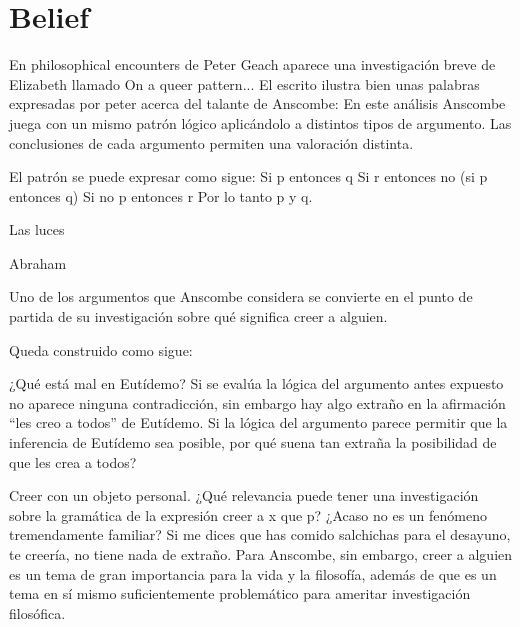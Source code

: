 \section{Belief}

En philosophical encounters de Peter Geach aparece una investigación breve de
Elizabeth llamado On a queer pattern... El escrito ilustra bien unas palabras
expresadas por peter acerca del talante de Anscombe:
En este análisis Anscombe juega con un mismo patrón lógico aplicándolo a
distintos tipos de argumento. Las conclusiones de cada argumento permiten una
valoración distinta.

El patrón se puede expresar como sigue:
Si p entonces q
Si r entonces no (si p entonces q)
Si no p entonces r
Por lo tanto p y q.

Las luces

Abraham

Uno de los argumentos que Anscombe considera se convierte en el punto de partida
de su investigación sobre qué significa creer a alguien.

Queda construido como sigue:

¿Qué está mal en Eutídemo? Si se evalúa la lógica del argumento antes expuesto
no aparece ninguna contradicción, sin embargo hay algo extraño en la afirmación
``les creo a todos'' de Eutídemo. Si la lógica del argumento parece permitir que
la inferencia de Eutídemo sea posible, por qué suena tan extraña la posibilidad
de que les crea a todos?

Creer con un objeto personal.
¿Qué relevancia puede tener una investigación sobre la gramática de la expresión
creer a x que p? ¿Acaso no es un fenómeno tremendamente familiar? Si me dices
que has comido salchichas para el desayuno, te creería, no tiene nada de
extraño. Para Anscombe, sin embargo, creer a alguien es un tema de gran
importancia para la vida y la filosofía, además de que es un tema en sí mismo
suficientemente problemático para ameritar investigación filosófica.

